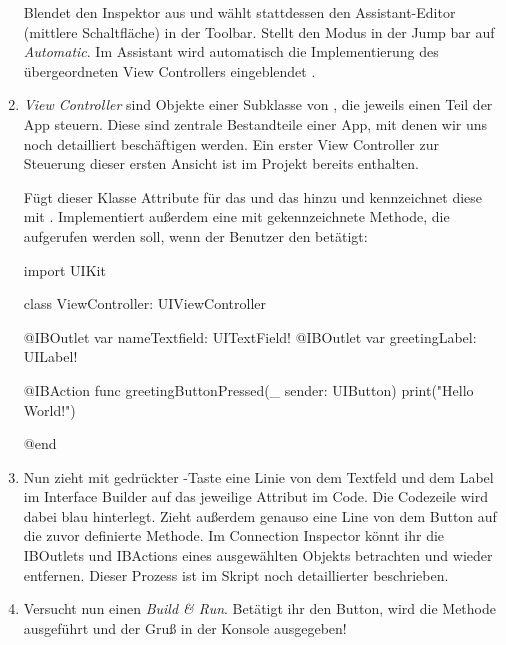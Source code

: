 \documentclass[parskip=half, final]{scrreprt}
\begin{document}
\begin{lecture}
\begin{enumerate}
Blendet den Inspektor aus und wählt stattdessen den Assistant-Editor (mittlere Schaltfläche) in der Toolbar. Stellt den Modus in der Jump bar auf \emph{Automatic}. Im Assistant wird automatisch die Implementierung des übergeordneten View Controllers eingeblendet .


\item \emph{View Controller} sind Objekte einer Subklasse von , die jeweils einen Teil der App steuern. Diese sind zentrale Bestandteile einer App, mit denen wir uns noch detailliert beschäftigen werden. Ein erster View Controller zur Steuerung dieser ersten Ansicht ist im Projekt bereits enthalten.

Fügt dieser Klasse  Attribute für das  und das  hinzu und kennzeichnet diese mit . Implementiert außerdem eine mit  gekennzeichnete Methode, die aufgerufen werden soll, wenn der Benutzer den  betätigt:

\begin{swiftcode}
import UIKit

class ViewController: UIViewController {

    @IBOutlet var nameTextfield: UITextField!
    @IBOutlet var greetingLabel: UILabel!

    @IBAction func greetingButtonPressed(_ sender: UIButton) {
        print("Hello World!")
    }
    
}
@end
\end{swiftcode}

\item Nun zieht mit gedrückter \keys{\ctrl}-Taste eine Linie von dem Textfeld und dem Label im Interface Builder auf das jeweilige Attribut im Code. Die Codezeile wird dabei blau hinterlegt. Zieht außerdem genauso eine Line von dem Button auf die zuvor definierte Methode. Im Connection Inspector könnt ihr die IBOutlets und IBActions eines ausgewählten Objekts betrachten und wieder entfernen. Dieser Prozess ist im Skript noch detaillierter beschrieben.

\item Versucht nun einen \emph{Build \& Run}. Betätigt ihr den Button, wird die Methode ausgeführt und der Gruß  in der Konsole ausgegeben!


\end{enumerate}
\end{lecture}
\end{document}
